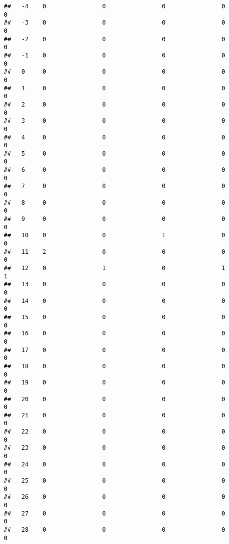 \documentclass[]{article}
\begin{document}
\begin{verbatim}
##   -4    0                0                0                0                0
##   -3    0                0                0                0                0
##   -2    0                0                0                0                0
##   -1    0                0                0                0                0
##   0     0                0                0                0                0
##   1     0                0                0                0                0
##   2     0                0                0                0                0
##   3     0                0                0                0                0
##   4     0                0                0                0                0
##   5     0                0                0                0                0
##   6     0                0                0                0                0
##   7     0                0                0                0                0
##   8     0                0                0                0                0
##   9     0                0                0                0                0
##   10    0                0                1                0                0
##   11    2                0                0                0                0
##   12    0                1                0                1                1
##   13    0                0                0                0                0
##   14    0                0                0                0                0
##   15    0                0                0                0                0
##   16    0                0                0                0                0
##   17    0                0                0                0                0
##   18    0                0                0                0                0
##   19    0                0                0                0                0
##   20    0                0                0                0                0
##   21    0                0                0                0                0
##   22    0                0                0                0                0
##   23    0                0                0                0                0
##   24    0                0                0                0                0
##   25    0                0                0                0                0
##   26    0                0                0                0                0
##   27    0                0                0                0                0
##   28    0                0                0                0                0

\end{verbatim}
\end{document}
